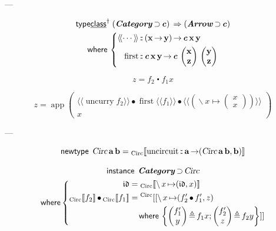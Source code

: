 \documentclass[a5paper,twoside,fleqn,draft]{jsbook}
\def\[{[\![}
\def\]{]\!]}
\def\llangle{\langle\!\langle}
\def\rrangle{\rangle\!\rangle}
\newcommand{\Langle}{\llangle}
\newcommand{\Rangle}{\rrangle}
\newcommand{\mKeyword}[1]{\mathsf{#1}}
\newcommand{\mKeywordUnderline}[1]{\text{\underline{\textsf{#1}}}}
\newcommand{\mInstanceDeclKeyword}{\mKeyword{instance}}
\newcommand{\mNewTypeDeclKeyword}{\mKeyword{newtype}}
\newcommand{\mTypeClassDeclKeyword}{\mKeyword{type}\mKeywordUnderline{class}}
\newcommand{\mWhereKeyword}{\mKeyword{where}}
\newcommand{\mPolymorphic}[1]{{#1}^\dagger}
\DeclareMathOperator{\mInstanceDecl}{\mInstanceDeclKeyword}
\DeclareMathOperator{\mNewTypeDecl}{\mNewTypeDeclKeyword}
\DeclareMathOperator{\mSuperClass}{\;\Rightarrow\;}
\DeclareMathOperator{\mSuperSet}{\supset}
\DeclareMathOperator{\mTypeClassDeclPolymorphic}{\mPolymorphic{\mTypeClassDeclKeyword}}
\DeclareMathOperator{\mWhere}{\mWhereKeyword}
\newcommand{\mSpecialFunc}[1]{\mathrm{#1}}
\newcommand{\mVarSpecialFunc}[1]{\mathfrak{#1}}
\DeclareMathOperator{\mIdCat}{\mVarSpecialFunc{id}}
\DeclareMathOperator{\mUncurry}{\mSpecialFunc{uncurry}}
\DeclareMathOperator{\mCompFunc}{\centerdot}
\DeclareMathOperator{\mCompCat}{\bullet}
\DeclareMathOperator{\mFuncArrow}{\rightarrow}
\DeclareMathOperator{\mIn}{{:\!:}}
\DeclareMathOperator{\mLambda}{\backslash}
\DeclareMathOperator{\mLambdaArrow}{\mapsto}
\DeclareMathOperator{\mLetEq}{\triangleq}
\newcommand{\mType}[1]{\mathbf{#1}} %
\newcommand{\mPolymorphicTypeParameter}[1]{\textbf{\textit{#1}}}
\newcommand{\mA}{\mType{a}}
\newcommand{\mB}{\mType{b}}
\newcommand{\mX}{\mType{x}}
\newcommand{\mY}{\mType{y}}
\newcommand{\mZ}{\mType{z}}
\newcommand{\mTypeConstructor}[1]{\textsl{#1}}
\newcommand{\mValueConstructor}[1]{\mathrm{#1}}
\newcommand{\mValueWith}[2]{{}_\mValueConstructor{#1}\[#2\]}
\newcommand{\mArrowWith}[1]{\Langle#1\Rangle}
\newcommand{\mPairWith}[2]{\begin{pmatrix}#1\\#2\end{pmatrix}}
\newcommand{\mTypeClass}[1]{\textbf{\textit{#1}}}
\newcommand{\mArrowTypeClass}{\mTypeClass{Arrow}}
\newcommand{\mCatTypeClass}{\mTypeClass{Category}}
\begin{document}
---

\newcommand{\mFirstFunc}{\mathop{\mathrm{first}}}

\begin{multline}
  \mTypeClassDeclPolymorphic\;
  (\mCatTypeClass\mSuperSet\mPolymorphicTypeParameter{c})
  \mSuperClass(\mArrowTypeClass\mSuperSet\mPolymorphicTypeParameter{c})\\
  \mWhere{}\left\{
  \begin{aligned}
    \mArrowWith{\dotsb}
    &\mIn{}(\mX\mFuncArrow\mY)\mFuncArrow\mPolymorphicTypeParameter{c}\,\mX\,\mY\\
    \mFirstFunc
    &\mIn{}\mPolymorphicTypeParameter{c}\,\mX\,\mY
    \mFuncArrow\mPolymorphicTypeParameter{c}\,\mPairWith{\mX}{\mZ}\,\mPairWith{\mY}{\mZ}
  \end{aligned}
  \right.
\end{multline}

\begin{equation}
  z=f_2\mCompFunc f_1x
\end{equation}

\begin{equation}
  z=\mathop{\mathrm{app}}\mPairWith{\mArrowWith{\mUncurry f_2}\mCompCat\mFirstFunc\mArrowWith{f_1}\mCompCat{}\mArrowWith{\left(\mLambda x\mLambdaArrow\mPairWith{x}{x}\right)}}{x}
\end{equation}

---


\newcommand{\mUncircuit}{\mathop{\mathrm{uncircuit}}}
\newcommand{\mCircuitType}{\mTypeConstructor{Circ}}
\newcommand{\mCircuitWith}[1]{\mValueWith{Circ}{#1}}

\begin{equation}
  \mNewTypeDecl\;
  \mCircuitType\,\mA\,\mB
  =\mCircuitWith{\mUncircuit\mIn\mA\mFuncArrow(\mCircuitType\,\mA\,\mB,\mB)}
\end{equation}

\begin{multline}
  \mInstanceDecl\;
  \mTypeClass{Category}\mSuperSet\mCircuitType\\
  \mWhere
  \left\{
  \begin{aligned}
    \mIdCat
    &=\mCircuitWith{\mLambda x\mLambdaArrow(\mIdCat,x)}\\
    \mCircuitWith{f_2}\mCompCat\mCircuitWith{f_1}
    &={}^{\textrm{Circ}}[[\mLambda x\mLambdaArrow(f_2'\mCompCat f_1',z)\\
    &\quad\mWhere{}\left\{
    \mPairWith{f_1'}{y}\mLetEq f_1x;
    \mPairWith{f_2'}{z}\mLetEq f_2y\right\}]]
  \end{aligned}
  \right.
\end{multline}
\end{document}
